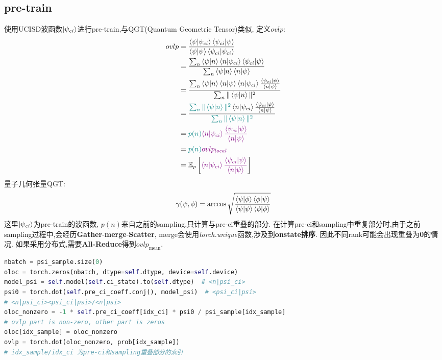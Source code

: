 \subsection{pre-train}

使用UCISD波函数$\ket{\psi_{ci}}$进行pre-train,与QGT(Quantum Geometric Tensor)类似, 定义$ovlp$:
\begin{equation}
    \begin{split}
        ovlp & = \frac{\braket{\psi|\psi_{ci}}{\braket{\psi_{ci}|\psi}}}
        {\braket{\psi|\psi}\braket{\psi_{ci}|\psi_{ci}}} \\
        & = \frac{\sum_n\braket{\psi|n}\braket{n|\psi_{ci}}\braket{\psi_{ci}|\psi}}
        {\sum_n{\braket{\psi|n}\braket{n|\psi}}} \\
        & = \frac{\sum_n\braket{\psi|n}\braket{n|\psi}\braket{n|\psi_{ci}}\frac{\braket{\psi_{ci}|\psi}}{\braket{n|\psi}}}
        {\sum_n \Vert \braket{\psi|n} \Vert^2} \\
        & = \frac{\textcolor{teal}{\sum_n \Vert \braket{\psi|n} \Vert^2} \braket{n|\psi_{ci}}\frac{\braket{\psi_{ci}|\psi}}{\braket{n|\psi}}}
        {\textcolor{teal}{\sum_n \Vert \braket{\psi|n} \Vert^2}} \\
        & = \textcolor{teal}{p(n)}\textcolor{violet}{\braket{n|\psi_{ci}}\frac{\braket{\psi_{ci}|\psi}}{\braket{n|\psi}}} \\
        & = \textcolor{teal}{p(n)}\textcolor{violet}{ovlp_{local}} \\
        & = \mathbb{E}_p\left[ \textcolor{violet}{\braket{n|\psi_{ci}}\frac{\braket{\psi_{ci}|\psi}}{\braket{n|\psi}}} \right] \\
    \end{split}
\end{equation}
量子几何张量QGT:
\begin{equation}
    \gamma(\psi, \phi) = \arccos \sqrt{\frac{\braket{\psi|\phi}\braket{\phi|\psi}}{\braket{\psi|\psi}\braket{\phi|\phi}}}
\end{equation}
这里$\ket{\psi_{ci}}$为pre-train的波函数,
$p(n)$来自之前的sampling,只计算与pre-ci重叠的部分.
在计算pre-ci和sampling中重复部分时,由于之前sampling过程中,会经历\textbf{Gather}-\textbf{merge}-\textbf{Scatter},
merge会使用\textit{torch.unique}函数,涉及到\textbf{onstate排序}.
因此不同rank可能会出现重叠为\textbf{0}的情况.
如果采用分布式,需要\textbf{All-Reduce}得到$ovlp_\mathrm{mean}$.
\begin{lstlisting}[language=Python]
nbatch = psi_sample.size(0)
oloc = torch.zeros(nbatch, dtype=self.dtype, device=self.device)
model_psi = self.model(self.ci_state).to(self.dtype)  # <n|psi_ci>
psi0 = torch.dot(self.pre_ci_coeff.conj(), model_psi)  # <psi_ci|psi>
# <n|psi_ci><psi_ci|psi>/<n|psi>
oloc_nonzero = -1 * self.pre_ci_coeff[idx_ci] * psi0 / psi_sample[idx_sample]
# ovlp part is non-zero, other part is zeros
oloc[idx_sample] = oloc_nonzero
ovlp = torch.dot(oloc_nonzero, prob[idx_sample])
# idx_sample/idx_ci 为pre-ci和sampling重叠部分的索引
\end{lstlisting}
